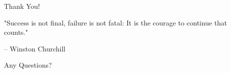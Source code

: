\begin{frame}[plain]
    \begin{center}
        {\Huge Thank You!}
        
        \vspace{1cm}
        
        {\LARGE "Success is not final, failure is not fatal: It is the courage to continue that counts."}
        
        \vspace{0.5cm}
        
        {\large -- Winston Churchill}
        
        \vspace{1cm}
        
        {\Large Any Questions?}
    \end{center}
\end{frame}